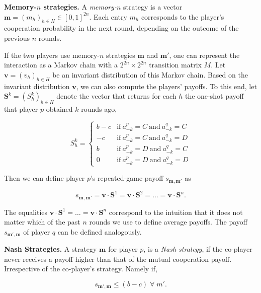 \documentclass{article}
\theoremstyle{definition}
\begin{document}
{\bf Memory-$n$ strategies.} A {\it memory-$n$} strategy is a vector
$\mathbf{m}=(m_h)_{h\in H}\in[0,1]^{2n}$. Each entry $m_h$ corresponds to the
player's cooperation probability in the next round, depending on the outcome of
the previous $n$ rounds.

If the two players use memory-$n$ strategies $\mathbf{m}$ and $\mathbf{m'}$, one
can represent the interaction as a Markov chain with a $2^{2n}\!\times\!2^{2n}$
transition matrix $M$. Let $\mathbf{v}=(v_h)_{h\in H}$ be an invariant
distribution of this Markov chain. Based on the invariant distribution $\mathbf{v}$, we can also compute the
players' payoffs. To this end, let $\mathbf{S}^k = (S_h^k)_{h\in H}$ denote the
vector that returns for each $h$ the one-shot payoff that player $p$ obtained
$k$ rounds ago,


\begin{equation}
    S_h^k = \left\{
    \begin{array}{cl}
    b-c	&\text{if}~ a_{-k}^p=C~\text{and}~ a_{-k}^q=C\\
    -c	&\text{if}~ a_{-k}^p=C~\text{and}~ a_{-k}^q=D\\
    b	&\text{if}~ a_{-k}^p=D~\text{and}~ a_{-k}^q=C\\
    0	&\text{if}~ a_{-k}^p=D~\text{and}~ a_{-k}^q=D
    \end{array}
    \right.
\end{equation}

Then we can define player $p$'s repeated-game payoff $s_{\mathbf{m},\mathbf{m'}}$ as

\begin{equation} \label{Eq:Payoff}
s_{\mathbf{m},\mathbf{m'}}  = \mathbf{v}\cdot \mathbf{S}^1 = \mathbf{v}\cdot \mathbf{S}^2 = \ldots = \mathbf{v} \cdot \mathbf{S}^n.
\end{equation}

The equalities $\mathbf{v}\cdot \mathbf{S}^1 = \ldots = \mathbf{v} \cdot
\mathbf{S}^n$ correspond to the intuition that it does not matter which of the
past $n$ rounds we use to define average payoffs. The payoff
$s_{\mathbf{m'},\mathbf{m}}$ of player $q$ can be defined analogously.


{\bf Nash Strategies.} A strategy $\mathbf{m}$ for player $p$, is a \textit{Nash
strategy}, if the co-player never receives a payoff higher than that of the
mutual cooperation payoff. Irrespective of the co-player's strategy. Namely if,

\begin{equation}\label{Eq:Nash}
    s_{\mathbf{m'},\mathbf{m}} \leq (b - c) \; \forall \; m'.
\end{equation}
\end{document}
